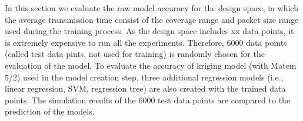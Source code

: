 







In this section we evaluate the \gls{raw} model accuracy for the  design space, in which the average transmission time consist of the coverage range and packet size range used during the training process. As the design space includes xx data points, it is extremely expensive to run all the experiments. Therefore, 6000 data points (called test data pints, not used for training) is randomly chosen for the evaluation of the model. To evaluate the accuracy of kriging model (with Matem 5/2) used in the model creation step, three additional regression models (i.e., linear regression, SVM, regression tree) are also created with the trained data points. The simulation results of the 6000 test data points are compared to the prediction of the models. 



